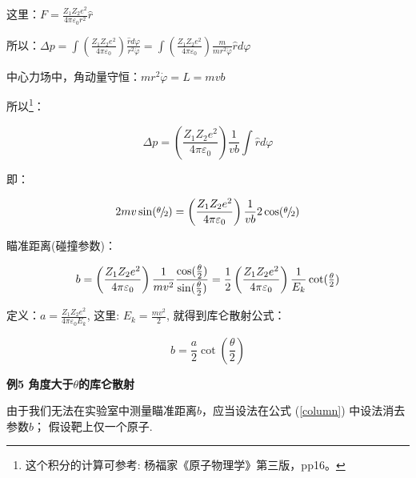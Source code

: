 这里：$F = \frac{{Z_1 Z_2 e^2 }}{{4\pi \varepsilon _0 r^2 }}\hat
r$

所以：$\Delta p = \int {\left( {\frac{{Z_1 Z_2 e^2 }}{{4\pi
\varepsilon _0 }}} \right)\frac{{\hat rd\varphi }}{{r^2 \dot
\varphi }}}  = \int {\left( {\frac{{Z_1 Z_2 e^2 }}{{4\pi
\varepsilon _0 }}} \right)} \frac{m}{{mr^2 \dot \varphi }}\hat
rd\varphi $

中心力场中，角动量守恒：$mr^2 \dot \varphi  = L = mvb$

所以\footnote{这个积分的计算可参考:
杨福家《原子物理学》第三版，pp16。}：

\begin{equation}
\Delta p = \left( {\frac{{Z_1
Z_2 e^2 }}{{4\pi \varepsilon _0 }}} \right)  \frac{1}{{vb}}\int
{\hat rd\varphi } 
\end{equation}

即：

\begin{equation}
2mv\sin ({\raise0.5ex\hbox{$\scriptstyle \theta $}
\kern-0.1em/\kern-0.15em \lower0.25ex\hbox{$\scriptstyle 2$}}) =
\left( {\frac{{Z_1 Z_2 e^2 }}{{4\pi \varepsilon _0 }}} \right)
 \frac{1}{{vb}} 2\cos ({\raise0.5ex\hbox{$\scriptstyle
\theta $} \kern-0.1em/\kern-0.15em \lower0.25ex\hbox{$\scriptstyle
2$}})
\end{equation}

瞄准距离(碰撞参数)：

\begin{equation}
b = \left( {\frac{{Z_1 Z_2 e^2 }}{{4\pi
\varepsilon _0 }}} \right)  \frac{1}{{mv^2 }} 
\frac{{\cos ({\textstyle{\theta  \over 2}})}}{{\sin
({\textstyle{\theta  \over 2}})}} = \frac{1}{2}\left( {\frac{{Z_1
Z_2 e^2 }}{{4\pi \varepsilon _0 }}} \right) \frac{1}{{E_k }}
 \cot ({\textstyle{\theta  \over 2}})
\end{equation}


定义：$a = \frac{{Z_1 Z_2 e^2 }}{{4\pi \varepsilon _0 E_k }}$, 这里:
$E_k  = \frac{{mv^2 }}{2}$, 就得到库仑散射公式：


\begin{equation}
b = \frac{a}{2} \cot \left( {\frac{\theta }{2}} \right)
\label{column}
\end{equation}


{\bf 例5 角度大于$\theta $的库仑散射}

由于我们无法在实验室中测量瞄准距离$b$，应当设法在公式
(\ref{column}) 中设法消去参数$b$； 假设靶上仅一个原子.

